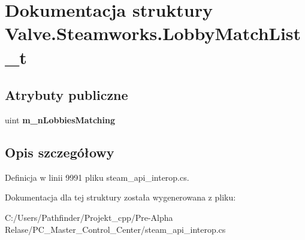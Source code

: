 \hypertarget{struct_valve_1_1_steamworks_1_1_lobby_match_list__t}{}\section{Dokumentacja struktury Valve.\+Steamworks.\+Lobby\+Match\+List\+\_\+t}
\label{struct_valve_1_1_steamworks_1_1_lobby_match_list__t}
\subsection*{Atrybuty publiczne}
\begin{DoxyCompactItemize}
\item 
\mbox{\label{struct_valve_1_1_steamworks_1_1_lobby_match_list__t_aaa0d84839275b9d2d0e47b3fd3830c75}} 
uint {\bfseries m\+\_\+n\+Lobbies\+Matching}
\end{DoxyCompactItemize}


\subsection{Opis szczegółowy}


Definicja w linii 9991 pliku steam\+\_\+api\+\_\+interop.\+cs.



Dokumentacja dla tej struktury została wygenerowana z pliku\+:\begin{DoxyCompactItemize}
\item 
C\+:/\+Users/\+Pathfinder/\+Projekt\+\_\+cpp/\+Pre-\/\+Alpha Relase/\+P\+C\+\_\+\+Master\+\_\+\+Control\+\_\+\+Center/steam\+\_\+api\+\_\+interop.\+cs\end{DoxyCompactItemize}
